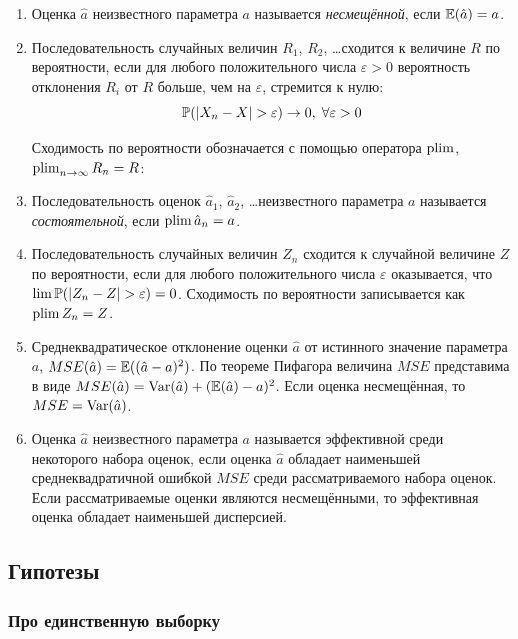 \documentclass[12pt, a4paper]{article}
\begin{document}
\begin{enumerate}

  \item Оценка $\hat a$ неизвестного параметра $a$ называется \textit{несмещённой}, если $\E(\hat a) = a$.

  \item Последовательность случайных величин $R_1$, $R_2$, \ldots сходится к величине $R$ по вероятности, если
  для любого положительного числа $\varepsilon >0$ вероятность отклонения $R_i$ от $R$ больше, чем на $\varepsilon$, стремится к нулю:
  \[
  \P(|X_n - X| > \varepsilon ) \to 0, \; \forall \varepsilon > 0
  \]

Сходимость по вероятности обозначается с помощью оператора $\plim$, $\plim_{n\to\infty} R_n = R$:


  \item Последовательность оценок $\hat a_1$, $\hat a_2$, \ldots неизвестного параметра $a$ называется \textit{состоятельной}, если $\plim \hat a_n = a$.

  \item Последовательность случайных величин $Z_n$ сходится к случайной величине $Z$ по вероятности,
если для любого положительного числа $\varepsilon$ оказывается,
что $\lim \P(|Z_n - Z|>\varepsilon) = 0$. Сходимость по вероятности записывается как $\plim Z_n = Z$.

\item Среднеквадратическое отклонение оценки $\hat a$ от истинного значение параметра $a$, $MSE(\hat a)=\E((\hat a - a)^2)$. По теореме Пифагора величина $MSE$ представима в виде $MSE(\hat a) = \Var(\hat a) + (\E(\hat a) - a)^2$. Если оценка несмещённая, то $MSE = \Var(\hat a)$.

\item Оценка $\hat a$ неизвестного параметра $a$ называется эффективной среди некоторого набора оценок, если оценка $\hat a$ обладает наименьшей среднеквадратичной ошибкой $MSE$ среди рассматриваемого набора оценок. Если рассматриваемые оценки являются несмещёнными, то эффективная оценка обладает наименьшей дисперсией.

\end{enumerate}


\subsection{Гипотезы}

\subsubsection{Про единственную выборку}
\end{document}
